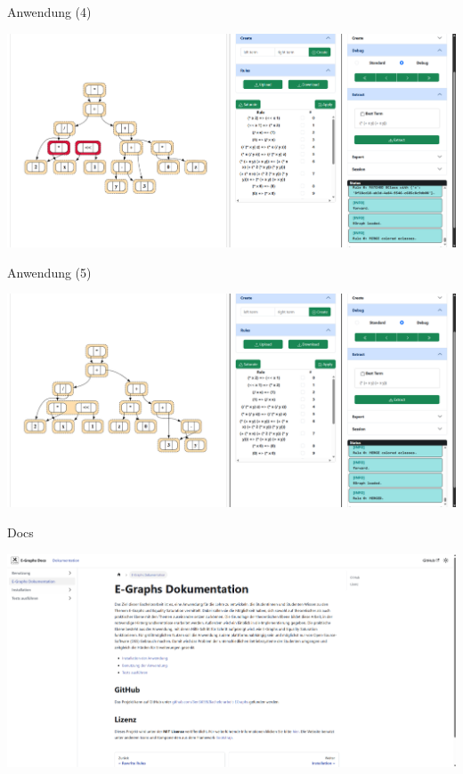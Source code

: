 \begin{frame}{Anwendung (4)}
    \begin{center}
        \includegraphics[scale=0.3]{utils/anwendung/anwendung4.png}
    \end{center}
\end{frame}

\begin{frame}{Anwendung (5)}
    \begin{center}
        \includegraphics[scale=0.3]{utils/anwendung/anwendung5.png}
    \end{center}
\end{frame}

\begin{frame}{Docs}
    \begin{center}
        \includegraphics[scale=0.3]{utils/anwendung/docs.png}
    \end{center}
\end{frame}

